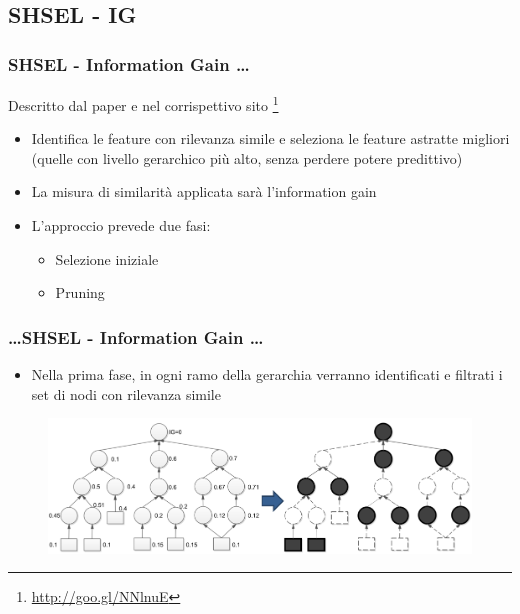 \documentclass{beamer}
\begin{document}
\subsection{SHSEL - IG}
\begin{frame}
	\frametitle{SHSEL - Information Gain \dots}
	Descritto dal paper \cite{ristoski2014feature} e nel corrispettivo sito \footnote{\url{http://goo.gl/NNlnuE}}
	\begin{itemize}
		\item Identifica le feature con rilevanza simile e seleziona le feature astratte migliori (quelle con livello gerarchico più alto, senza perdere potere predittivo)
		\item La misura di similarità applicata sarà l'information gain
	\item L'approccio prevede due fasi:
	\begin{itemize}
		\item Selezione iniziale
		\item Pruning
	\end{itemize}
	\end{itemize}
\end{frame}

\begin{frame}
	\frametitle{\dots SHSEL - Information Gain \dots}
	\begin{itemize}
		\item Nella prima fase, in ogni ramo della gerarchia verranno identificati e filtrati i set di nodi con rilevanza simile
	\end{itemize}
	\begin{figure}[tbph]
		\centering
		\vspace{-0.2cm}
		\includegraphics[width=0.9\linewidth]{figure/Mannheim/SHSEL_Phase1.png}
		\label{fig:SHSELPhase1}
	\end{figure}
\end{frame}
\end{document}

